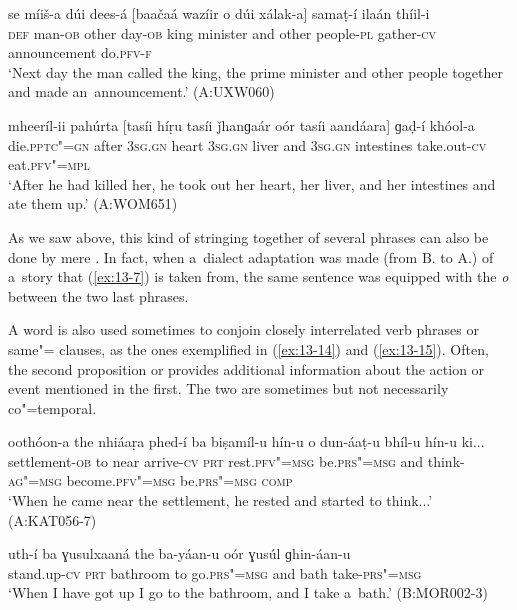 \begin{exe}
\ex
\label{ex:13-12}
\gll se míiš-a dúi dees-á [baačaá wazíir o dúi xálak-a] samaṭ-í ilaán thíil-i \\
\textsc{def} man-\textsc{ob} other day-\textsc{ob} king minister and other  people-\textsc{pl} gather-\textsc{cv} announcement do.\textsc{pfv-f}  \\
\glt `Next day the man called the king, the prime minister and other people together and made an~announcement.' (A:UXW060)

\ex
\label{ex:13-13}
\gll mheeríl-ii pahúrta [tasíi híṛu tasíi ǰhanɡaár oór tasíi aandáara] ɡaḍ-í khóol-a  \\
die.\textsc{pptc"=gn} after \textsc{3sg.gn} heart \textsc{3sg.gn}  liver and \textsc{3sg.gn} intestines take.out-\textsc{cv} eat.\textsc{pfv"=mpl}\\
\glt `After he had killed her, he took out her heart, her liver, and her intestines and ate them up.' (A:WOM651) 
\end{exe}

As we saw above, this kind of stringing together of several  phrases can also be done by mere . In fact, when a~dialect adaptation was made (from B. to A.) of a~story that (\ref{ex:13-7}) is taken from, the same sentence was equipped with the  \textit{o} between the two last  phrases. 


A  word is also used sometimes to conjoin closely interrelated verb phrases or same"= clauses, as the ones exemplified in (\ref{ex:13-14}) and (\ref{ex:13-15}). Often, the second proposition or  provides additional information about the action or event mentioned in the first. The two are sometimes but not necessarily co"=temporal.

\begin{exe}
\ex
\label{ex:13-14}
\gll oothóon-a the nhiáaṛa phed-í ba biṣamíl-u hín-u o dun-áaṭ-u bhíl-u hín-u ki...\\
settlement-\textsc{ob} to near arrive-\textsc{cv} \textsc{prt} rest.\textsc{pfv"=msg} be.\textsc{prs"=msg} and think-\textsc{ag"=msg} become.\textsc{pfv"=msg} be.\textsc{prs"=msg } \textsc{comp} \\
\glt `When he came near the settlement, he rested and started to think...' (A:KAT056-7)

\ex
\label{ex:13-15}
\gll uth-í ba ɣusulxaaná the ba-yáan-u oór ɣusúl ɡhin-áan-u \\
stand.up-\textsc{cv} \textsc{prt} bathroom to go.\textsc{prs"=msg}  and bath take-\textsc{prs"=msg} \\
\glt `When I have got up I go to the bathroom, and I take a~bath.' (B:MOR002-3) 
\end{exe}

